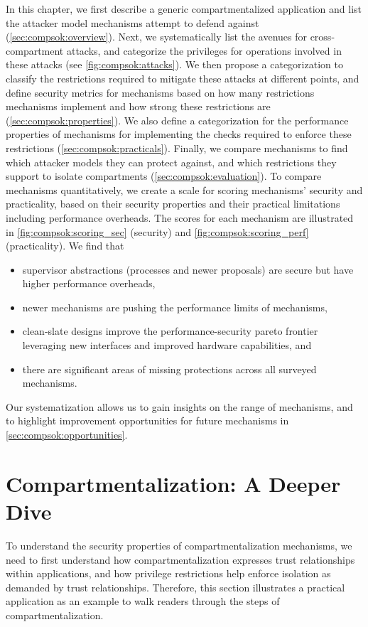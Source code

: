 In this chapter, we first describe a generic compartmentalized application
and list the attacker model mechanisms attempt to defend 
against (\autoref{sec:compsok:overview}).
Next, we systematically list the avenues for cross-compartment
attacks, and categorize the privileges for operations involved in these
attacks (see \autoref{fig:compsok:attacks}).
We then propose a categorization to classify the restrictions required to 
mitigate these attacks at different points, 
and define security metrics for mechanisms based on how many restrictions 
mechanisms implement and how strong these restrictions
are (\autoref{sec:compsok:properties}).
We also define a categorization for the performance properties of mechanisms
for implementing the checks required to enforce these 
restrictions (\autoref{sec:compsok:practicals}).
Finally, we compare \nmechs mechanisms to find which attacker
models they can protect against, and which restrictions they support
to isolate compartments (\autoref{sec:compsok:evaluation}).
To compare mechanisms quantitatively, we create a scale for
scoring mechanisms' security and practicality, based on their security
properties and their practical limitations including performance overheads.
The scores for each mechanism are illustrated in 
\autoref{fig:compsok:scoring_sec} (security) and 
\autoref{fig:compsok:scoring_perf} (practicality).
We find that
\begin{itemize}
  \item supervisor abstractions (processes and newer proposals) are secure
        but have higher performance overheads,
  \item newer mechanisms are pushing the performance limits of 
        mechanisms, 
  \item clean-slate designs improve the performance-security pareto frontier
        leveraging new interfaces and improved hardware capabilities, and
  \item there are significant areas of missing protections across all
        surveyed mechanisms.
\end{itemize}
Our systematization allows us to gain insights on the range of mechanisms, 
and to highlight improvement opportunities for future mechanisms in 
\autoref{sec:compsok:opportunities}.

\section{Compartmentalization: A Deeper Dive}
\label{sec:compsok:overview}
To understand the security properties of compartmentalization mechanisms,
we need to first understand how compartmentalization expresses trust
relationships within applications, and how privilege restrictions
help enforce isolation as demanded by trust relationships.
Therefore, this section illustrates a practical application as an example
to walk readers through the steps of compartmentalization.

